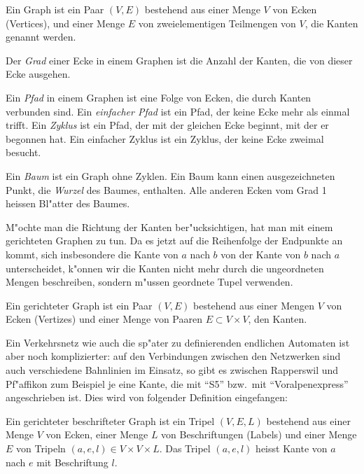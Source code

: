 \begin{definition}
\label{def_graph}
Ein Graph ist ein Paar $(V,E)$ bestehend aus einer Menge $V$ von Ecken
(Vertices),
und einer Menge $E$ von zweielementigen Teilmengen von $V$, die Kanten
genannt werden.
\end{definition}

Der {\em Grad} einer Ecke in einem Graphen ist die Anzahl der Kanten,
die von dieser Ecke ausgehen.

Ein {\em Pfad} in einem Graphen ist eine Folge von Ecken, die durch Kanten
verbunden sind.
Ein {\em einfacher Pfad} ist ein Pfad, der keine Ecke mehr
als einmal trifft.
Ein {\em Zyklus} ist ein Pfad, der mit der gleichen Ecke
beginnt, mit der er begonnen hat.
Ein einfacher Zyklus ist ein Zyklus,
der keine Ecke zweimal besucht.

Ein {\em Baum} ist ein Graph ohne Zyklen. Ein Baum kann einen ausgezeichneten
Punkt, die {\em Wurzel} des Baumes, enthalten. Alle anderen Ecken vom Grad 1
heissen Bl"atter des Baumes.

M"ochte man die Richtung der Kanten ber"ucksichtigen,
hat man mit einem gerichteten
Graphen zu tun. Da es jetzt auf die Reihenfolge der Endpunkte an kommt,
sich insbesondere die Kante von $a$ nach $b$ von der Kante von $b$ nach
$a$ unterscheidet, k"onnen wir die Kanten nicht mehr durch die ungeordneten
Mengen beschreiben, sondern m"ussen geordnete Tupel verwenden.

\begin{definition}
\label{def_gerichteter_graph}
Ein gerichteter Graph ist ein Paar $(V,E)$ bestehend aus einer
Mengen $V$ von Ecken (Vertizes) und einer Menge von Paaren $E\subset V\times V$,
den Kanten.
\end{definition}

Ein Verkehrsnetz wie auch die sp"ater zu definierenden endlichen
Automaten ist aber noch komplizierter: auf den Verbindungen zwischen
den Netzwerken sind auch verschiedene Bahnlinien im Einsatz, so gibt
es zwischen Rapperswil und Pf"affikon zum Beispiel je eine Kante, die
mit ``S5'' bzw.~mit ``Voralpenexpress'' angeschrieben ist. Dies
wird von folgender Definition eingefangen:

\begin{definition}
\label{def_gerichteter_beschrifteter_graph}
Ein gerichteter beschrifteter Graph ist ein Tripel $(V,E,L)$ bestehend
aus einer Menge $V$ von Ecken, einer Menge $L$ von Beschriftungen (Labels) und 
einer Menge $E$ von Tripeln $(a,e,l)\in V\times V\times L$. Das
Tripel $(a,e,l)$ heisst Kante von $a$ nach $e$ mit Beschriftung $l$.
\end{definition}

